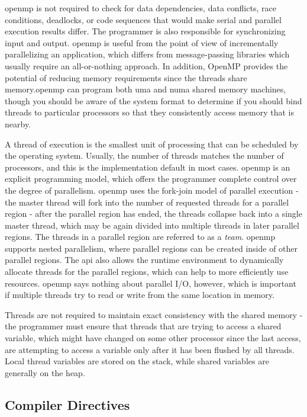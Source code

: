 \documentclass[10pt]{article}
\begin{document}
\begin{flushleft}
\gls{openmp} is not required to check for data dependencies, data conflicts, race conditions, deadlocks, or code sequences that would make serial and parallel execution results differ. The programmer is also responsible for synchronizing input and output. \gls{openmp} is useful from the point of view of incrementally parallelizing an application, which differs from message-passing libraries which usually require an all-or-nothing approach. In addition, OpenMP provides the potential of reducing memory requirements since the threads share memory.\gls{openmp} can program both \gls{uma} and \gls{numa} shared memory machines, though you should be aware of the system format to determine if you should bind threads to particular processors so that they consistently access memory that is nearby.

A thread of execution is the smallest unit of processing that can be scheduled by the operating system. Usually, the number of threads matches the number of processors, and this is the implementation default in most cases. \gls{openmp} is an explicit programming model, which offers the programmer complete control over the degree of parallelism. \gls{openmp} uses the fork-join model of parallel execution - the master thread will fork into the number of requested threads for a parallel region - after the parallel region has ended, the threads collapse back into a single master thread, which may be again divided into multiple threads in later parallel regions. The threads in a parallel region are referred to as a \textit{team}. \gls{openmp} supports nested parallelism, where parallel regions can be created inside of other parallel regions. The \gls{api} also allows the runtime environment to dynamically allocate threads for the parallel regions, which can help to more efficiently use resources. \gls{openmp} says nothing about parallel I/O, however, which is important if multiple threads try to read or write from the same location in memory.

Threads are not required to maintain exact consistency with the shared memory - the programmer must ensure that threads that are trying to access a shared variable, which might have changed on some other processor since the last access, are attempting to access a variable only after it has been flushed by all threads. Local thread variables are stored on the stack, while shared variables are generally on the heap.

\subsection{Compiler Directives}


\end{flushleft}
\end{document}
